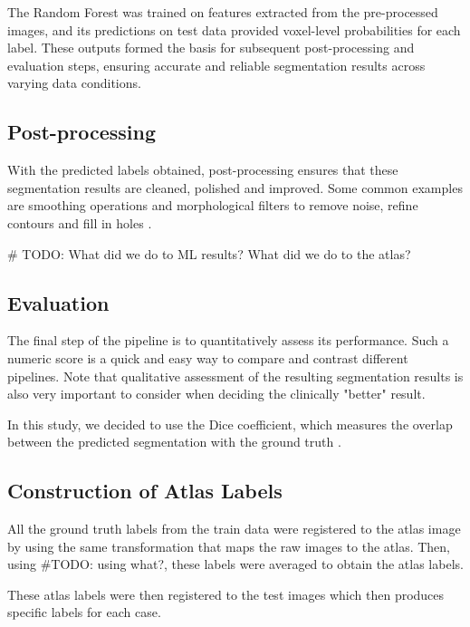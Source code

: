 The Random Forest was trained on features extracted from the pre-processed images, and its predictions on test data provided voxel-level probabilities for each label. These outputs formed the basis for subsequent post-processing and evaluation steps, ensuring accurate and reliable segmentation results across varying data conditions.


\subsection{Post-processing}

With the predicted labels obtained, post-processing ensures that these segmentation results are cleaned, polished and improved. Some common examples are smoothing operations and morphological filters to remove noise, refine contours and fill in holes \cite{b11}.

\# TODO: What did we do to ML results? What did we do to the atlas?

\subsection{Evaluation}

The final step of the pipeline is to quantitatively assess its performance. Such a numeric score is a quick and easy way to compare and contrast different pipelines. Note that qualitative assessment of the resulting segmentation results is also very important to consider when deciding the clinically "better" result.

In this study, we decided to use the Dice coefficient, which measures the overlap between the predicted segmentation with the ground truth \cite{b12}.

\subsection{Construction of Atlas Labels}

All the ground truth labels from the train data were registered to the atlas image by using the same transformation that maps the raw images to the atlas. Then, using \#TODO: using what?, these labels were averaged to obtain the atlas labels.

These atlas labels were then registered to the test images which then produces specific labels for each case.




